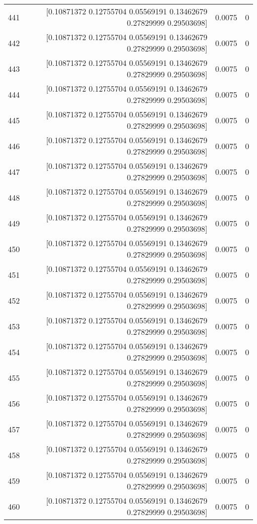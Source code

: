 \begin{longtable}{lrrr}
441 & [0.10871372 0.12755704 0.05569191 0.13462679 0.27829999 0.29503698] & 0.0075 & 0 \\
442 & [0.10871372 0.12755704 0.05569191 0.13462679 0.27829999 0.29503698] & 0.0075 & 0 \\
443 & [0.10871372 0.12755704 0.05569191 0.13462679 0.27829999 0.29503698] & 0.0075 & 0 \\
444 & [0.10871372 0.12755704 0.05569191 0.13462679 0.27829999 0.29503698] & 0.0075 & 0 \\
445 & [0.10871372 0.12755704 0.05569191 0.13462679 0.27829999 0.29503698] & 0.0075 & 0 \\
446 & [0.10871372 0.12755704 0.05569191 0.13462679 0.27829999 0.29503698] & 0.0075 & 0 \\
447 & [0.10871372 0.12755704 0.05569191 0.13462679 0.27829999 0.29503698] & 0.0075 & 0 \\
448 & [0.10871372 0.12755704 0.05569191 0.13462679 0.27829999 0.29503698] & 0.0075 & 0 \\
449 & [0.10871372 0.12755704 0.05569191 0.13462679 0.27829999 0.29503698] & 0.0075 & 0 \\
450 & [0.10871372 0.12755704 0.05569191 0.13462679 0.27829999 0.29503698] & 0.0075 & 0 \\
451 & [0.10871372 0.12755704 0.05569191 0.13462679 0.27829999 0.29503698] & 0.0075 & 0 \\
452 & [0.10871372 0.12755704 0.05569191 0.13462679 0.27829999 0.29503698] & 0.0075 & 0 \\
453 & [0.10871372 0.12755704 0.05569191 0.13462679 0.27829999 0.29503698] & 0.0075 & 0 \\
454 & [0.10871372 0.12755704 0.05569191 0.13462679 0.27829999 0.29503698] & 0.0075 & 0 \\
455 & [0.10871372 0.12755704 0.05569191 0.13462679 0.27829999 0.29503698] & 0.0075 & 0 \\
456 & [0.10871372 0.12755704 0.05569191 0.13462679 0.27829999 0.29503698] & 0.0075 & 0 \\
457 & [0.10871372 0.12755704 0.05569191 0.13462679 0.27829999 0.29503698] & 0.0075 & 0 \\
458 & [0.10871372 0.12755704 0.05569191 0.13462679 0.27829999 0.29503698] & 0.0075 & 0 \\
459 & [0.10871372 0.12755704 0.05569191 0.13462679 0.27829999 0.29503698] & 0.0075 & 0 \\
460 & [0.10871372 0.12755704 0.05569191 0.13462679 0.27829999 0.29503698] & 0.0075 & 0 \\

\end{longtable}
